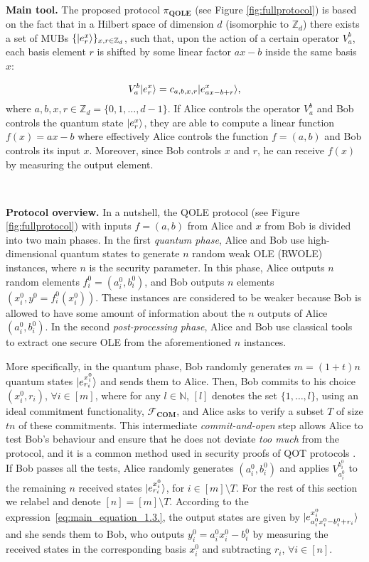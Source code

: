 \

\noindent\textbf{Main tool.} The proposed protocol $\pi_{\textbf{QOLE}}$ (see Figure \ref{fig:fullprotocol}) is based on the fact that in a Hilbert space of dimension $d$ (isomorphic to $\mathbb{Z}_d$) there exists a set of MUBs $\{| e^x_r \rangle\}_{x, r\in\mathbb{Z}_d}$, such that, upon the action of a certain operator $V^b_a$,  each basis element $r$ is shifted by some linear factor $ax - b$ inside the same basis $x$:

\begin{equation}
    V^b_a | e^x_r \rangle = c_{a,b,x, r} | e^x_{ax - b + r} \rangle,
    \label{eq:main_equation_1.3.}
\end{equation}
where $a, b, x, r \in \mathbb{Z}_d =\{0,1,\ldots,d-1\}$. If Alice controls the operator $V^b_a$ and Bob controls the quantum state $| e^x_r \rangle$, they are able to compute a linear function $f(x) = ax - b$ where effectively Alice controls the function $f = (a, b)$ and Bob controls its input $x$. Moreover, since Bob controls $x$ and $r$, he can receive $f(x)$ by measuring the output element. 

\

\noindent\textbf{Protocol overview.} In a nutshell, the QOLE protocol (see Figure \ref{fig:fullprotocol}) with inputs $f = (a,b)$ from Alice and $x$ from Bob is divided into two main phases. In the first \textit{quantum phase}, Alice and Bob use high-dimensional quantum states to generate $n$ random weak OLE (RWOLE) instances, where $n$ is the security parameter.  In this phase, Alice  outputs  $n$ random elements $f^0_i = (a^0_i, b^0_i)$, and Bob  outputs $n$ elements $(x^0_i, y^0 = f^0_i(x^0_i))$. These instances are considered to be weaker because Bob is allowed to have some amount of information about the $n$ outputs of Alice $(a^0_i, b^0_i)$. In the second \textit{post-processing phase}, Alice and Bob use classical tools to extract one secure OLE from the aforementioned $n$ instances.

More specifically, in the quantum phase, Bob randomly generates $m=(1 + t)n$ quantum states $| e^{x^0_i}_{r_i} \rangle$ and sends them to Alice. Then, Bob commits to his choice $(x^0_i, r_i)$, $\forall i\in [m]$, where for any $l\in\mathbb{N}$, $[l]$ denotes the set $\{1, \ldots, l\}$, using an ideal commitment functionality, $\mathcal{F}_{\textbf{COM}}$, and Alice asks to verify  a subset $T$ of size $tn$ of these commitments. This intermediate \textit{commit-and-open} step allows Alice to test Bob's behaviour and ensure that he does not deviate \textit{too much} from the protocol, and it is a common method used in security proofs of QOT protocols \cite{Unruh10, DFLSS09}. If Bob passes all the tests, Alice randomly generates $(a^0_i, b^0_i)$ and applies $V^{b^0_i}_{a^0_i}$ to the remaining $n$ received states $| e^{x^0_i}_{r_i} \rangle$,  for $i\in [m]\setminus T$.  For the rest of this section we relabel and denote $[n]=[m]\setminus T$. According to the expression~\eqref{eq:main_equation_1.3.}, the output states are given by $| e^{x^0_i}_{a^0_i x^0_i - b^0_i + r_i} \rangle$ and she sends them to Bob, who outputs $y^0_i = a^0_i x^0_i - b^0_i$ by measuring the received states in the corresponding basis $ x^0_i$ and subtracting $r_i$,  $\forall i\in [n]$. 


